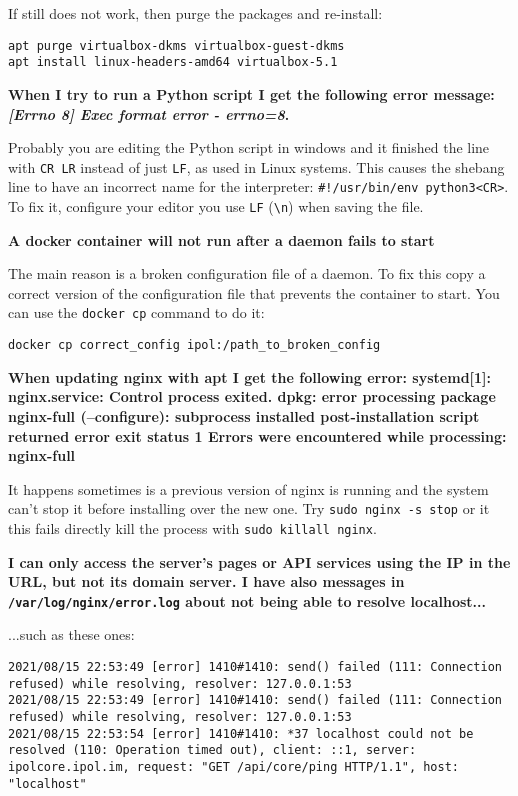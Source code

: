 \documentclass[a4paper,12pt]{article}
\begin{document}
If still does not work, then purge the packages and re-install:

\begin{verbatim}
apt purge virtualbox-dkms virtualbox-guest-dkms
apt install linux-headers-amd64 virtualbox-5.1
\end{verbatim}
\vspace{0.5cm}

\textbf{When I try to run a Python script I get the following error message: \emph{[Errno 8] Exec format error - errno=8}.}

Probably you are editing the Python script in windows and it finished the line with {\tt CR LR} instead of just {\tt LF}, as used in Linux systems. This causes the shebang line to have an incorrect name for the interpreter: {\tt \#!/usr/bin/env python3<CR>}. To fix it, configure your editor you use {\tt LF} ({\tt \textbackslash n}) when saving the file.
\vspace{0.5cm}

\textbf{A docker container will not run after a daemon fails to start}

The main reason is a broken configuration file of a daemon. To fix this copy a correct version of the configuration file that prevents the container to start. You can use the {\tt docker cp} command to do it:

\begin{verbatim}
docker cp correct_config ipol:/path_to_broken_config
\end{verbatim}

\textbf{When updating nginx with apt I get the following error: systemd[1]: nginx.service: Control process exited. dpkg: error processing package nginx-full (--configure):  subprocess installed post-installation script returned error exit status 1 Errors were encountered while processing:  nginx-full}

It happens sometimes is a previous version of nginx is running and the system can't stop it before installing over the new one. Try {\tt sudo nginx -s stop} or it this fails directly kill the process with {\tt sudo killall nginx}.
\vspace{0.5cm}

\textbf{I can only access the server's pages or API services using the IP in the URL, but not its domain server. I have also messages in {\tt /var/log/nginx/error.log} about not being able to resolve localhost...}

...such as these ones:
\begin{verbatim}
2021/08/15 22:53:49 [error] 1410#1410: send() failed (111: Connection refused) while resolving, resolver: 127.0.0.1:53
2021/08/15 22:53:49 [error] 1410#1410: send() failed (111: Connection refused) while resolving, resolver: 127.0.0.1:53
2021/08/15 22:53:54 [error] 1410#1410: *37 localhost could not be resolved (110: Operation timed out), client: ::1, server: ipolcore.ipol.im, request: "GET /api/core/ping HTTP/1.1", host: "localhost"
\end{verbatim}
\end{document}
